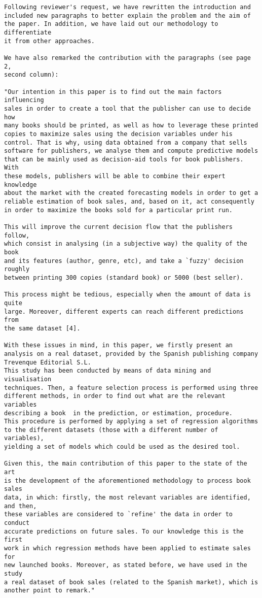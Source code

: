 \documentclass[preprint]{elsarticle}
\begin{document}
\begin{verbatim}
Following reviewer's request, we have rewritten the introduction and 
included new paragraphs to better explain the problem and the aim of 
the paper. In addition, we have laid out our methodology to differentiate 
it from other approaches.

We have also remarked the contribution with the paragraphs (see page 2,
second column):

"Our intention in this paper is to find out the main factors influencing
sales in order to create a tool that the publisher can use to decide how 
many books should be printed, as well as how to leverage these printed
copies to maximize sales using the decision variables under his
control. That is why, using data obtained from a company that sells
software for publishers, we analyse them and compute predictive models 
that can be mainly used as decision-aid tools for book publishers. With 
these models, publishers will be able to combine their expert knowledge 
about the market with the created forecasting models in order to get a 
reliable estimation of book sales, and, based on it, act consequently 
in order to maximize the books sold for a particular print run. 

This will improve the current decision flow that the publishers follow, 
which consist in analysing (in a subjective way) the quality of the book 
and its features (author, genre, etc), and take a `fuzzy' decision roughly
between printing 300 copies (standard book) or 5000 (best seller).

This process might be tedious, especially when the amount of data is quite
large. Moreover, different experts can reach different predictions from 
the same dataset [4].

With these issues in mind, in this paper, we firstly present an 
analysis on a real dataset, provided by the Spanish publishing company 
Trevenque Editorial S.L.
This study has been conducted by means of data mining and visualisation
techniques. Then, a feature selection process is performed using three
different methods, in order to find out what are the relevant variables
describing a book  in the prediction, or estimation, procedure. 
This procedure is performed by applying a set of regression algorithms 
to the different datasets (those with a different number of variables), 
yielding a set of models which could be used as the desired tool. 

Given this, the main contribution of this paper to the state of the art 
is the development of the aforementioned methodology to process book sales 
data, in which: firstly, the most relevant variables are identified, and then,
these variables are considered to `refine' the data in order to conduct
accurate predictions on future sales. To our knowledge this is the first 
work in which regression methods have been applied to estimate sales for 
new launched books. Moreover, as stated before, we have used in the study 
a real dataset of book sales (related to the Spanish market), which is 
another point to remark."
\end{verbatim}
\end{document}
